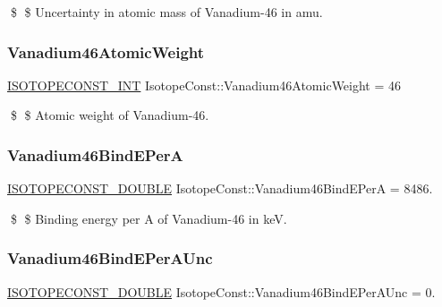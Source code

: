 \$ \$ Uncertainty in atomic mass of Vanadium-\/46 in amu. \mbox{\label{group___isotope_const-_vanadium-_v46_ga557e5781370e1dea7969895314f4287a}} 
\subsubsection{\texorpdfstring{Vanadium46\+Atomic\+Weight}{Vanadium46AtomicWeight}}
{\footnotesize\ttfamily \mbox{\hyperlink{group___isotope_const-_macros_ga5f18360b3e99483a35c32d789e62621c}{I\+S\+O\+T\+O\+P\+E\+C\+O\+N\+S\+T\+\_\+\+I\+NT}} Isotope\+Const\+::\+Vanadium46\+Atomic\+Weight = 46}

\$ \$ Atomic weight of Vanadium-\/46. \mbox{\label{group___isotope_const-_vanadium-_v46_ga5c0b0186dc794a1544f7b4e53e19d362}} 
\subsubsection{\texorpdfstring{Vanadium46\+Bind\+E\+PerA}{Vanadium46BindEPerA}}
{\footnotesize\ttfamily \mbox{\hyperlink{group___isotope_const-_macros_ga8f45a7272ce02c0b4c65c44636ed719a}{I\+S\+O\+T\+O\+P\+E\+C\+O\+N\+S\+T\+\_\+\+D\+O\+U\+B\+LE}} Isotope\+Const\+::\+Vanadium46\+Bind\+E\+PerA = 8486.}

\$ \$ Binding energy per A of Vanadium-\/46 in keV. \mbox{\label{group___isotope_const-_vanadium-_v46_ga9f5853b31750dfcb42d77b37bd1cd9ed}} 
\subsubsection{\texorpdfstring{Vanadium46\+Bind\+E\+Per\+A\+Unc}{Vanadium46BindEPerAUnc}}
{\footnotesize\ttfamily \mbox{\hyperlink{group___isotope_const-_macros_ga8f45a7272ce02c0b4c65c44636ed719a}{I\+S\+O\+T\+O\+P\+E\+C\+O\+N\+S\+T\+\_\+\+D\+O\+U\+B\+LE}} Isotope\+Const\+::\+Vanadium46\+Bind\+E\+Per\+A\+Unc = 0.}

